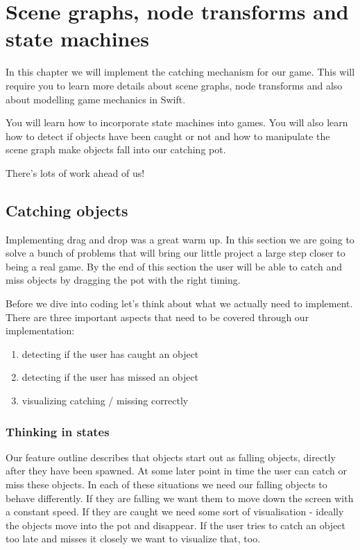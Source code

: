\chapter{Scene graphs, node transforms and state machines}
In this chapter we will implement the catching mechanism for our game. This will
require you to learn more details about scene graphs, node transforms and also about modelling game mechanics in Swift.

You will learn how to incorporate state machines into games. You will also learn
how to detect if objects have been caught or not and how to manipulate the
scene graph make objects fall into our catching pot.

There's lots of work ahead of us!

\section{Catching objects}
Implementing drag and drop was a great warm up. In this section we are going to
solve a bunch of problems that will bring our little project a large step closer
to being a real game. By the end of this section the user will be able to catch
and miss objects by dragging the pot with the right timing.

Before we dive into coding let's think about what we actually need to implement.
There are three important aspects that need to be covered through our
implementation:
\begin{enumerate}
  \item detecting if the user has caught an object
  \item detecting if the user has missed an object
  \item visualizing catching / missing correctly
\end{enumerate}

\subsection{Thinking in states}
Our feature outline describes that objects start out as falling objects,
directly after they have been spawned. At some later point in time the user can
catch or miss these objects. In each of these situations we need our falling objects to behave differently. If they are
falling we want them to move down the screen with a constant speed. If they are
caught we need some sort of visualisation - ideally the objects move into the
pot and disappear. If the user tries to catch an object too late and misses it
closely we want to visualize that, too.

